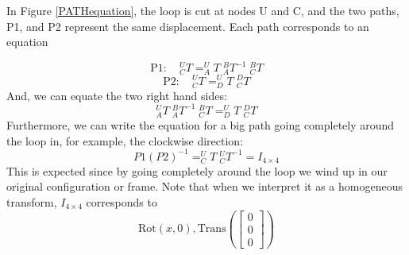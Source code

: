 In Figure \ref{PATHequation}, the loop is cut at nodes U and C, and the two paths, P1, and P2 represent
the same displacement. Each path corresponds to an equation

\[
\mathrm{P1:} \quad  ^U_CT = ^U_AT \; ^B_AT^{-1} \; ^B_CT
\]
\[
\mathrm{P2:} \quad  ^U_CT = ^U_DT \;^D_CT
\]
And, we can equate the two right hand sides:
\[
^U_AT \;^B_AT^{-1} \; ^B_CT =  ^U_DT \;^D_CT
\]
Furthermore, we can write the equation for a big path going completely
around the loop in, for example, the clockwise direction:
\[
P1(P2)^{-1} = ^U_CT \;^U_CT^{-1} = I_{4\times4}
\]
This is expected since by going completely around the loop we wind up in our original configuration or frame.    Note that when we interpret it as a homogeneous transform, $I_{4\times4}$ corresponds to
\[
\mathrm{Rot}(x,0), \mathrm{Trans}
   \left(  \left [
    \begin{array}{c} 0 \\ 0 \\ 0  \end{array}
    \right ]  \right )
\]



